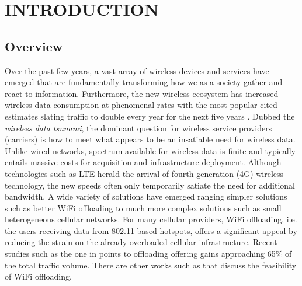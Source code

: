 %
%
%
%
%
%
%
%


%
%

\chapter{INTRODUCTION}

\section{Overview}

Over the past few years, a vast array of wireless devices and services have emerged that are fundamentally transforming how we as a society gather and react to information.  Furthermore, the new wireless ecosystem has increased wireless data consumption at phenomenal rates with the most popular cited estimates slating traffic to double every year for the next five years \cite{CiscoAnnualCellGrowth}.  Dubbed the \emph{wireless data tsunami}, the dominant question for wireless service providers (carriers) is how to meet what appears to be an insatiable need for wireless data.  Unlike wired networks, spectrum available for wireless data is finite and typically entails massive costs for acquisition and infrastructure deployment.  Although
technologies such as LTE herald the arrival of fourth-generation (4G) wireless technology, the new speeds often only temporarily satiate the need for additional bandwidth. A wide variety of solutions have emerged ranging simpler solutions such as better WiFi offloading to much more complex solutions such as small heterogeneous cellular networks. For many cellular providers, WiFi offloading, i.e. the users receiving data from 802.11-based hotspots, offers a significant appeal by reducing the strain on the already overloaded cellular infrastructure. Recent studies such as the one in \cite{lee2010mobile} points to offloading offering gains approaching 65\% of the total traffic volume. There are other works such as \cite{balasubramanian2010augmenting, dimatteo2011cellular, han2011mobile, icc2012performance} that discuss the feasibility of WiFi offloading. 

